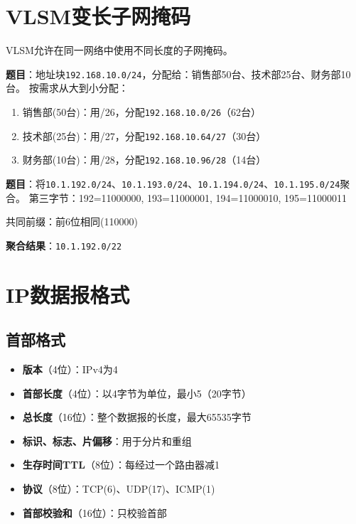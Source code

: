 \section{VLSM变长子网掩码}
VLSM允许在同一网络中使用不同长度的子网掩码。

\begin{examplebox}[例题4.3 VLSM地址分配]
\textbf{题目}：地址块\texttt{192.168.10.0/24}，分配给：销售部50台、技术部25台、财务部10台。
\tcblower
按需求从大到小分配：
\begin{enumerate}[itemsep=0pt]
    \item 销售部(50台)：用/26，分配\texttt{192.168.10.0/26}（62台）
    \item 技术部(25台)：用/27，分配\texttt{192.168.10.64/27}（30台）
    \item 财务部(10台)：用/28，分配\texttt{192.168.10.96/28}（14台）
\end{enumerate}
\end{examplebox}

\begin{examplebox}[例题4.4 路由聚合]
\textbf{题目}：将\texttt{10.1.192.0/24}、\texttt{10.1.193.0/24}、\texttt{10.1.194.0/24}、\texttt{10.1.195.0/24}聚合。
\tcblower
第三字节：192=11000000, 193=11000001, 194=11000010, 195=11000011

共同前缀：前6位相同(110000)

\textbf{聚合结果}：\texttt{10.1.192.0/22}
\end{examplebox}

\section{IP数据报格式}
\subsection{首部格式}
\begin{itemize}[leftmargin=2em,itemsep=0pt]
    \item \textbf{版本}（4位）：IPv4为4
    \item \textbf{首部长度}（4位）：以4字节为单位，最小5（20字节）
    \item \textbf{总长度}（16位）：整个数据报的长度，最大65535字节
    \item \textbf{标识、标志、片偏移}：用于分片和重组
    \item \textbf{生存时间TTL}（8位）：每经过一个路由器减1
    \item \textbf{协议}（8位）：TCP(6)、UDP(17)、ICMP(1)
    \item \textbf{首部校验和}（16位）：只校验首部
\end{itemize}

